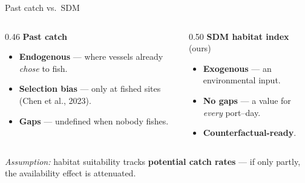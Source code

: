 \documentclass[aspectratio=169,11pt]{beamer}
\begin{document}
\begin{frame}{Past catch vs.\ SDM}
\begin{columns}[T,onlytextwidth]
\begin{column}{0.46\textwidth}
\textbf{Past catch}
\begin{itemize}\small
  \item[\textcolor{red!70}{\ding{55}}] \textbf{Endogenous} --- where vessels already \emph{chose} to fish.
  \item[\textcolor{red!70}{\ding{55}}] \textbf{Selection bias} --- only at fished sites (Chen et al., 2023).
  \item[\textcolor{red!70}{\ding{55}}] \textbf{Gaps} --- undefined when nobody fishes.
\end{itemize}
\end{column}
\hfill
\begin{column}{0.50\textwidth}
\textbf{SDM habitat index} {\scriptsize(ours)}
\begin{itemize}\small
  \item[\textcolor{udecgold}{\ding{51}}] \textbf{Exogenous} --- an environmental input.
  \item[\textcolor{udecgold}{\ding{51}}] \textbf{No gaps} --- a value for \emph{every} port--day.
  \item[\textcolor{udecgold}{\ding{51}}] \textbf{Counterfactual-ready}.
\end{itemize}
\end{column}
\end{columns}

\par
\vskip12pt
{\scriptsize\color{black!60}\emph{Assumption:} habitat suitability tracks \textbf{potential
catch rates} --- if only partly, the availability effect is attenuated.\par}

\end{frame}
\end{document}
